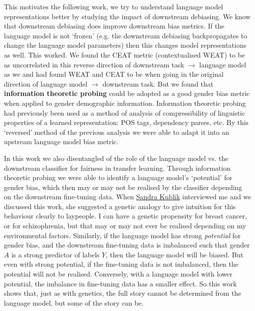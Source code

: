 This motivates the following work, we try to understand language model representations better by studying the impact of downstream debiasing. We know that downstream debiasing does improve downstream bias metrics. If the language model is not `frozen' (e.g. the downstream debiasing backpropagates to change the language model parameters) then this changes model representations as well. This worked. We found the CEAT metric (contextualised WEAT) to be as uncorrelated in this reverse direction of downstream task $\rightarrow$ language model as we and \citep{cao-etal-2022-intrinsic} had found WEAT and CEAT to be when going in the original direction of language model $\rightarrow$ downstream task. But we found that \textbf{information theoretic probing} could be adopted as a good gender bias metric when applied to gender demographic information. Information theoretic probing had previously been used as a method of analysis of compressibility of linguistic properties of a learned representation: POS tags, dependency parses, etc. By this `reversed' method of the previous analysis we were able to adapt it into an upstream language model bias metric.

In this work we also disentangled of the role of the language model vs. the downstream classifier for fairness in transfer learning. Through information theoretic probing we were able to identify a language model's `potential' for gender bias, which then may or may not be realised by the classifier depending on the downstream fine-tuning data. When \href{https://about.me/sandra_kublik}{Sandra Kublik} interviewed me and we discussed this work, she suggested a genetic analogy to give intuition for this behaviour clearly to laypeople. I can have a genetic propensity for breast cancer, or for schizophrenia, but that may or may not ever be realised depending on my environmental factors. 
Similarly, if the language model has strong \textit{potential} for gender bias, and the downstream fine-tuning data is imbalanced such that gender $A$ is a strong predictor of labels $Y$, then the language model will be biased. But even with strong potential, if the fine-tuning data is not imbalanced, then the potential will not be realised. Conversely, with a language model with lower potential, the imbalance in fine-tuning data has a smaller effect. 
So this work shows that, just as with genetics, the full story cannot be determined from the language model, but some of the story can be.

